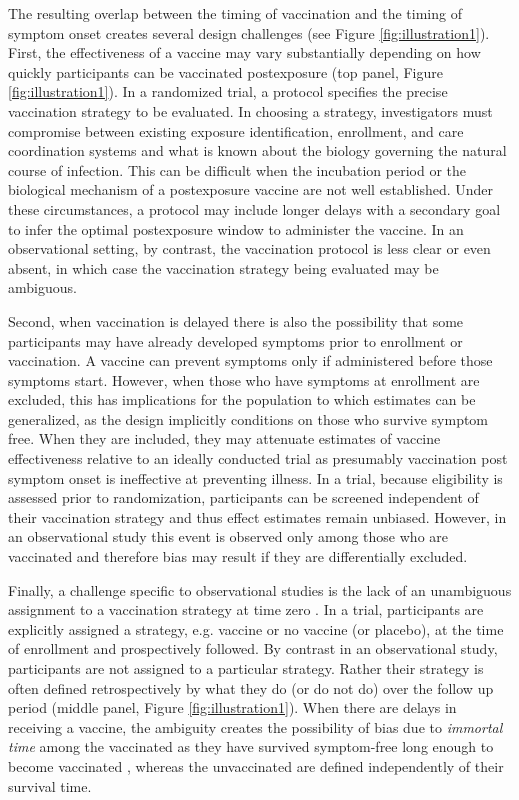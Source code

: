 \documentclass[11pt]{article}
\begin{document}
The resulting overlap between the timing of vaccination and the timing of symptom onset creates several design challenges (see Figure \ref{fig:illustration1}). First, the effectiveness of a vaccine may vary substantially depending on how quickly participants can be vaccinated postexposure (top panel, Figure \ref{fig:illustration1}). In a randomized trial, a protocol specifies the precise vaccination strategy to be evaluated. In choosing a strategy, investigators must compromise between existing exposure identification, enrollment, and care coordination systems and what is known about the biology governing the natural course of infection. This can be difficult when the incubation period or the biological mechanism of a postexposure vaccine are not well established. Under these circumstances, a protocol may include longer delays with a secondary goal to infer the optimal postexposure window to administer the vaccine. In an observational setting, by contrast, the vaccination protocol is less clear or even absent, in which case the vaccination strategy being evaluated may be ambiguous.

Second, when vaccination is delayed there is also the possibility that some participants may have already developed symptoms prior to enrollment or vaccination. A vaccine can prevent symptoms only if administered before those symptoms start. However, when those who have symptoms at enrollment are excluded, this has implications for the population to which estimates can be generalized, as the design implicitly conditions on those who survive symptom free. When they are included, they may attenuate estimates of vaccine effectiveness relative to an ideally conducted trial as presumably vaccination post symptom onset is ineffective at preventing illness. In a trial, because eligibility is assessed prior to randomization, participants can be screened independent of their vaccination strategy and thus effect estimates remain unbiased. However, in an observational study this event is observed only among those who are vaccinated and therefore bias may result if they are differentially excluded.

Finally, a challenge specific to observational studies is the lack of an unambiguous assignment to a vaccination strategy at time zero \cite{hernan_how_2018}. In a trial, participants are explicitly assigned a strategy, e.g. vaccine or no vaccine (or placebo), at the time of enrollment and prospectively followed. By contrast in an observational study, participants are not assigned to a particular strategy. Rather their strategy is often defined retrospectively by what they do (or do not do) over the follow up period (middle panel, Figure \ref{fig:illustration1}). When there are delays in receiving a vaccine, the ambiguity creates the possibility of bias due to \textit{immortal time} among the vaccinated as they have survived symptom-free long enough to become vaccinated \cite{suissa_immortal_2008}, whereas the unvaccinated are defined independently of their survival time. 
\end{document}
